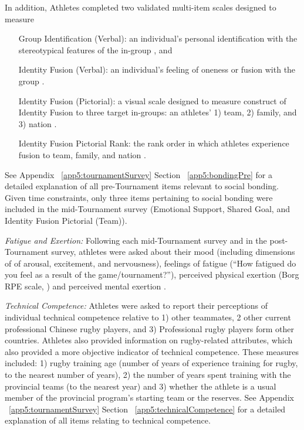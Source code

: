 In addition, Athletes completed two validated multi-item scales designed to measure

\begin{itemize}
  \item[Group Identification (Verbal):] an individual's personal identification with the stereotypical features of the in-group \citep[Group Identification Verbal Scale, see][]{Mael1992}, and
  \item[Identity Fusion (Verbal):] an individual's feeling of oneness or fusion with the group \citep[Identity Fusion Verbal Scale, see][]{Swann2009}.
  \item[Identity Fusion (Pictorial):] a visual scale designed to measure construct of Identity Fusion to three target in-groups: an athletes' 1) team, 2) family, and 3) nation \citep[Identity Fusion Pictorial][]{Swann2009}.
  \item[Identity Fusion Pictorial Rank:] the rank order in which athletes experience fusion to team, family, and nation \citep[replicating][]{Whitehouse2014}.
\end{itemize}

See Appendix ~\ref{app5:tournamentSurvey} Section ~\ref{app5:bondingPre} for a detailed explanation of all pre-Tournament items relevant to social bonding.  Given time constraints, only three items pertaining to social bonding were included in the mid-Tournament survey (Emotional Support, Shared Goal, and Identity Fusion Pictorial (Team)).

\textit{Fatigue and Exertion:} Following each mid-Tournament survey and in the post-Tournament survey, athletes were asked about their mood (including dimensions of  of arousal, excitement, and nervousness), feelings of fatigue (``How fatigued do you feel as a result of the game/tournament?''), perceived physical exertion (Borg RPE scale, \citep{Borg1990}) and perceived mental exertion \citep[see][ ]{Noakes2012a}.

\textit{Technical Competence:} Athletes were asked to report their perceptions of individual technical competence relative to 1) other teammates, 2 other current professional Chinese rugby players, and  3) Professional rugby players form other countries.  Athletes also provided information on rugby-related attributes, which also provided a more objective indicator of technical competence.  These measures included: 1) rugby training age (number of years of experience training for rugby, to the nearest number of years), 2) the number of years spent training with the provincial teams (to the nearest year) and 3) whether the athlete is a usual member of the provincial program's starting team or the reserves.  See Appendix ~\ref{app5:tournamentSurvey} Section ~\ref{app5:technicalCompetence} for a detailed explanation of all items relating to technical competence.

